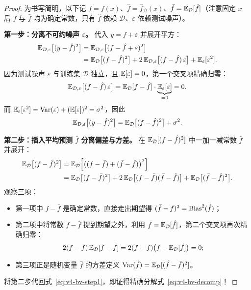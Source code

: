 \begin{proof}
为书写简明，以下记 $f = f(x)$、$\hat{f} = \hat{f}_{\mathcal{D}}(x)$、$\bar{f} = \mathbb{E}_{\mathcal{D}}[\hat{f}]$（注意固定 $x$ 后 $f$ 与 $\bar{f}$ 均为确定常数，只有 $\hat{f}$ 依赖 $\mathcal{D}$、$\varepsilon$ 依赖测试噪声）。

\textbf{第一步：分离不可约噪声 $\varepsilon$。} 代入 $y = f + \varepsilon$ 并展开平方：
\begin{align*}
  \mathbb{E}_{\mathcal{D}, \varepsilon}\big[(y - \hat{f})^2\big]
  &= \mathbb{E}_{\mathcal{D}, \varepsilon}\big[(f - \hat{f} + \varepsilon)^2\big] \\
  &= \mathbb{E}_{\mathcal{D}}\big[(f - \hat{f})^2\big] + 2\,\mathbb{E}_{\mathcal{D}, \varepsilon}\big[(f - \hat{f})\,\varepsilon\big] + \mathbb{E}_{\varepsilon}[\varepsilon^2].
\end{align*}
因为测试噪声 $\varepsilon$ 与训练集 $\mathcal{D}$ 独立，且 $\mathbb{E}[\varepsilon] = 0$，第一个交叉项精确归零：
\[
  \mathbb{E}_{\mathcal{D}, \varepsilon}\big[(f - \hat{f})\,\varepsilon\big] = \mathbb{E}_{\mathcal{D}}[f - \hat{f}] \cdot \underbrace{\mathbb{E}_{\varepsilon}[\varepsilon]}_{= 0} = 0.
\]
而 $\mathbb{E}_{\varepsilon}[\varepsilon^2] = \operatorname{Var}(\varepsilon) + (\mathbb{E}[\varepsilon])^2 = \sigma^2$，因此
\begin{equation}\label{eq:v4-bv-step1}
  \mathbb{E}_{\mathcal{D}, \varepsilon}\big[(y - \hat{f})^2\big] = \mathbb{E}_{\mathcal{D}}\big[(f - \hat{f})^2\big] + \sigma^2.
\end{equation}

\textbf{第二步：插入平均预测 $\bar{f}$ 分离偏差与方差。} 在 $\mathbb{E}_{\mathcal{D}}[(f - \hat{f})^2]$ 中一加一减常数 $\bar{f}$ 并展开：
\begin{align*}
  \mathbb{E}_{\mathcal{D}}\big[(f - \hat{f})^2\big]
  &= \mathbb{E}_{\mathcal{D}}\Big[\big((f - \bar{f}) + (\bar{f} - \hat{f})\big)^2\Big] \\
  &= \mathbb{E}_{\mathcal{D}}\big[(f - \bar{f})^2\big] + 2\,\mathbb{E}_{\mathcal{D}}\big[(f - \bar{f})(\bar{f} - \hat{f})\big] + \mathbb{E}_{\mathcal{D}}\big[(\bar{f} - \hat{f})^2\big].
\end{align*}
观察三项：
\begin{itemize}
  \item 第一项中 $f - \bar{f}$ 是确定常数，直接走出期望得 $(\bar{f} - f)^2 = \operatorname{Bias}^2(\hat{f})$；
  \item 第二项中将常数 $f - \bar{f}$ 提到期望之外，利用 $\bar{f} = \mathbb{E}_{\mathcal{D}}[\hat{f}]$，第二个交叉项再次精确归零：
  \[
    2(f - \bar{f})\,\mathbb{E}_{\mathcal{D}}[\bar{f} - \hat{f}] = 2(f - \bar{f})\big(\bar{f} - \mathbb{E}_{\mathcal{D}}[\hat{f}]\big) = 0;
  \]
  \item 第三项正是随机变量 $\hat{f}$ 的方差定义 $\operatorname{Var}(\hat{f}) = \mathbb{E}_{\mathcal{D}}[(\hat{f} - \bar{f})^2]$。
\end{itemize}
将第二步代回式~\eqref{eq:v4-bv-step1}，即证得精确分解式~\eqref{eq:v4-bv-decomp}！
\end{proof}

